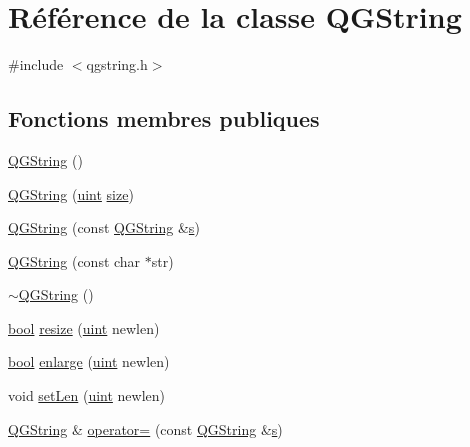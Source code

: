 \hypertarget{class_q_g_string}{}\section{Référence de la classe Q\+G\+String}
\label{class_q_g_string}


{\ttfamily \#include $<$qgstring.\+h$>$}

\subsection*{Fonctions membres publiques}
\begin{DoxyCompactItemize}
\item 
\hyperlink{class_q_g_string_a3ad08e53037f02993b626cbb9a6bea9a}{Q\+G\+String} ()
\item 
\hyperlink{class_q_g_string_a4b7f1d7d9196ee284e8613daa3f2e7b4}{Q\+G\+String} (\hyperlink{qglobal_8h_a4d3943ddea65db7163a58e6c7e8df95a}{uint} \hyperlink{class_q_g_string_abaeb3ec3797729e457aea15edc240ade}{size})
\item 
\hyperlink{class_q_g_string_a100431601206d32a3f272375213c7629}{Q\+G\+String} (const \hyperlink{class_q_g_string}{Q\+G\+String} \&\hyperlink{060__command__switch_8tcl_a011c73f2dbb87635a3b4206c72355f6e}{s})
\item 
\hyperlink{class_q_g_string_ac070cab1f8a7e40fb779adb925b63d10}{Q\+G\+String} (const char $\ast$str)
\item 
\hyperlink{class_q_g_string_afe4106d65183087777eb276ef415e20c}{$\sim$\+Q\+G\+String} ()
\item 
\hyperlink{qglobal_8h_a1062901a7428fdd9c7f180f5e01ea056}{bool} \hyperlink{class_q_g_string_a6263402a34882078f7f2962d3b1ca13d}{resize} (\hyperlink{qglobal_8h_a4d3943ddea65db7163a58e6c7e8df95a}{uint} newlen)
\item 
\hyperlink{qglobal_8h_a1062901a7428fdd9c7f180f5e01ea056}{bool} \hyperlink{class_q_g_string_a099adb917ca8294e71bea0b86ef32857}{enlarge} (\hyperlink{qglobal_8h_a4d3943ddea65db7163a58e6c7e8df95a}{uint} newlen)
\item 
void \hyperlink{class_q_g_string_a892704e70f3b99e36126eccf042a25fa}{set\+Len} (\hyperlink{qglobal_8h_a4d3943ddea65db7163a58e6c7e8df95a}{uint} newlen)
\item 
\hyperlink{class_q_g_string}{Q\+G\+String} \& \hyperlink{class_q_g_string_a171c21ad69a00411e592e386ad4f8852}{operator=} (const \hyperlink{class_q_g_string}{Q\+G\+String} \&\hyperlink{060__command__switch_8tcl_a011c73f2dbb87635a3b4206c72355f6e}{s})

\end{DoxyCompactItemize}
